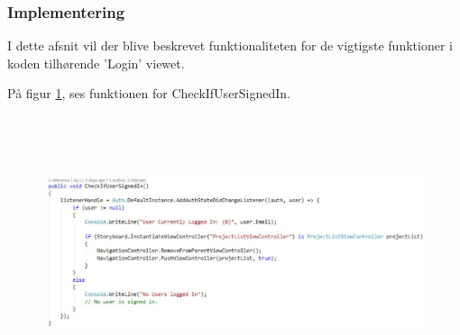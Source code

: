 \clearpage

\subsubsection{Implementering}
I dette afsnit vil der blive beskrevet funktionaliteten for de vigtigste funktioner i koden tilhørende 'Login' viewet.

På figur \ref{fig:Checkifusersigned}, ses funktionen for CheckIfUserSignedIn.
\begin{figure}[H] %
	\centering
	\includegraphics[height=8cm, width=15cm]{../ArkitekturDesign/Design/Login/Checkifusersigned}
	\caption{}
	\label{fig:Checkifusersigned}
\end{figure}
